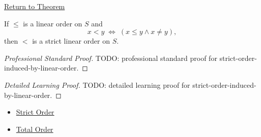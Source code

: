 \newpage
{}
\label{prf:strict-order-induced-by-linear-order}

\begin{remark*}[Return]
\hyperref[thm:strict-order-induced-by-linear-order]{Return to Theorem}
\end{remark*}

\begin{theorem*}
If $\leq$ is a linear order on $S$ and
\[
x<y \;\Longleftrightarrow\; (x\leq y\land x\neq y),
\]
then $<$ is a strict linear order on $S$.
\end{theorem*}

\begin{proof}[Professional Standard Proof]
\LRAProofBodyStart
TODO: professional standard proof for strict-order-induced-by-linear-order.
\end{proof}

\begin{proof}[Detailed Learning Proof]
\LRAProofBodyStart
TODO: detailed learning proof for strict-order-induced-by-linear-order.
\end{proof}

\begin{remark*}
\end{remark*}

\begin{dependencies}
\begin{itemize}
  \item \hyperref[def:strict-order]{Strict Order}
  \item \hyperref[def:total-order]{Total Order}
\end{itemize}
\end{dependencies}

\clearpage

